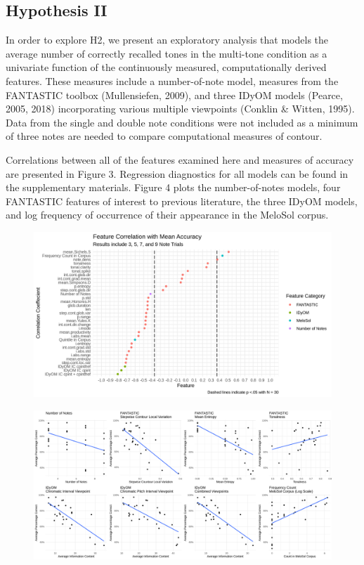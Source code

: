 \documentclass[english,man,floatsintext]{apa6}
\begin{document}
\hypertarget{hypothesis-ii}{%
\subsection{Hypothesis II}\label{hypothesis-ii}}

In order to explore H2, we present an exploratory analysis that models the average number of correctly recalled tones in the multi-tone condition as a univariate function of the continuously measured, computationally derived features.
These measures include a number-of-note model, measures from the FANTASTIC toolbox (Mullensiefen, 2009), and three IDyOM models (Pearce, 2005, 2018) incorporating various multiple viewpoints (Conklin \& Witten, 1995).
Data from the single and double note conditions were not included as a minimum of three notes are needed to compare computational measures of contour.

Correlations between all of the features examined here and measures of accuracy are presented in Figure 3.
Regression diagnostics for all models can be found in the supplementary materials.
Figure 4 plots the number-of-notes models, four FANTASTIC features of interest to previous literature, the three IDyOM models, and log frequency of occurrence of their appearance in the MeloSol corpus.

\begin{figure}
\includegraphics[width=9in]{../figures/cor_plot_fig_h2} \caption{ }\label{fig:unnamed-chunk-3}
\end{figure}

\begin{figure}
\includegraphics[width=15.75in]{../figures/cowplot} \caption{ }\label{fig:unnamed-chunk-4}
\end{figure}
\end{document}
